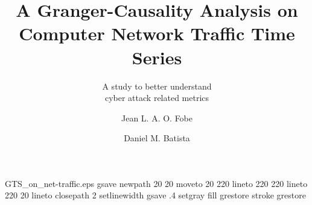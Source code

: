 %
%
%
%
%
\begin{filecontents*}{GTS_on_net-traffic.eps}
gsave
newpath
  20 20 moveto
  20 220 lineto
  220 220 lineto
  220 20 lineto
closepath
2 setlinewidth
gsave
  .4 setgray fill
grestore
stroke
grestore
\end{filecontents*}
%
\RequirePackage{fix-cm}
%
\documentclass{svjour3}                     %
%
\smartqed  %
%
\usepackage{graphicx}
%
\usepackage{mathptmx}      %
%
%
%
%


\title{A Granger-Causality Analysis on Computer Network Traffic Time Series
}
\subtitle{A study to better understand\\ cyber attack related metrics}


\author{Jean L. A. O. Fobe         \and
        Daniel M. Batista %
}



